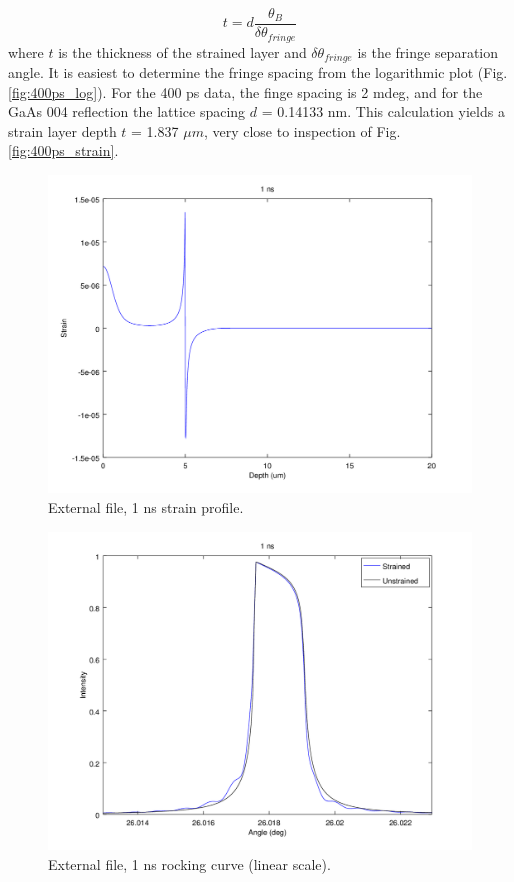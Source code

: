 \documentclass[letterpaper,11pt]{article}
\begin{document}
\begin{equation}
t = d \dfrac{\theta_B}{\delta \theta_{fringe}}
\end{equation}
where $t$ is the thickness of the strained layer and $\delta \theta_{fringe}$ is the fringe separation angle.  It is easiest to determine the fringe spacing from the logarithmic plot (Fig. \ref{fig:400ps_log}).  For the 400 ps data, the finge spacing is 2 mdeg, and for the GaAs 004 reflection the lattice spacing $d$ = 0.14133 nm.  This calculation yields a strain layer depth $t$ = 1.837 $\mu m$, very close to inspection of Fig. \ref{fig:400ps_strain}.

\begin{figure}
\begin{centering}
\includegraphics[scale=0.65]{1ns_strain.png}
\caption{External file, 1 ns strain profile.}
\label{fig:1ns_strain}
\end{centering}
\end{figure}

\begin{figure}
\begin{centering}
\includegraphics[scale=0.65]{1ns_lin.png}
\caption{External file, 1 ns rocking curve (linear scale).}
\label{fig:1ns_lin}
\end{centering}
\end{figure}
\end{document}
